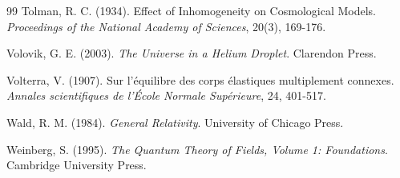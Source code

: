 \begin{thebibliography}{99}
Tolman, R. C. (1934). Effect of Inhomogeneity on Cosmological Models. \textit{Proceedings of the National Academy of Sciences}, 20(3), 169-176.

Volovik, G. E. (2003). \textit{The Universe in a Helium Droplet}. Clarendon Press.

Volterra, V. (1907). Sur l'\'equilibre des corps \'elastiques multiplement connexes. \textit{Annales scientifiques de l'\'Ecole Normale Sup\'erieure}, 24, 401-517.

Wald, R. M. (1984). \textit{General Relativity}. University of Chicago Press.

Weinberg, S. (1995). \textit{The Quantum Theory of Fields, Volume 1: Foundations}. Cambridge University Press.

\end{thebibliography}






